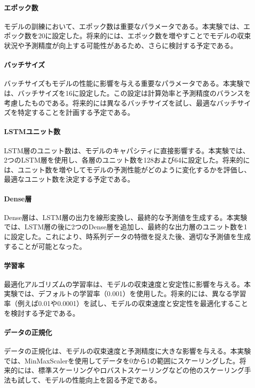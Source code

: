 \documentclass[a4paper, 11pt, titlepage]{jsarticle}
\begin{document}
\paragraph{エポック数}
\indent モデルの訓練において、エポック数は重要なパラメータである。本実験では、エポック数を20に設定した。将来的には、エポック数を増やすことでモデルの収束状況や予測精度が向上する可能性があるため、さらに検討する予定である。

\paragraph{バッチサイズ}
\indent バッチサイズもモデルの性能に影響を与える重要なパラメータである。本実験では、バッチサイズを16に設定した。この設定は計算効率と予測精度のバランスを考慮したものである。将来的には異なるバッチサイズを試し、最適なバッチサイズを特定することを計画する予定である。

\paragraph{LSTMユニット数}
\indent LSTM層のユニット数は、モデルのキャパシティに直接影響する。本実験では、2つのLSTM層を使用し、各層のユニット数を128および64に設定した。将来的には、ユニット数を増やしてモデルの予測性能がどのように変化するかを評価し、最適なユニット数を決定する予定である。

\paragraph{Dense層}
\indent Dense層は、LSTM層の出力を線形変換し、最終的な予測値を生成する。本実験では、LSTM層の後に2つのDense層を追加し、最終的な出力層のユニット数を1に設定した。これにより、時系列データの特徴を捉えた後、適切な予測値を生成することが可能となった。

\paragraph{学習率}
\indent 最適化アルゴリズムの学習率は、モデルの収束速度と安定性に影響を与える。本実験では、デフォルトの学習率（0.001）を使用した。将来的には、異なる学習率（例えば0.01や0.0001）を試し、モデルの収束速度と安定性を最適化することを検討する予定である。

\paragraph{データの正規化}
\indent データの正規化は、モデルの収束速度と予測精度に大きな影響を与える。本実験では、MinMaxScalerを使用してデータを0から1の範囲にスケーリングした。将来的には、標準スケーリングやロバストスケーリングなどの他のスケーリング手法も試して、モデルの性能向上を図る予定である。
\end{document}
